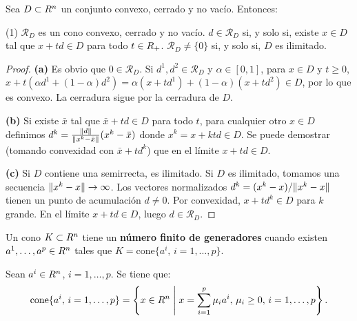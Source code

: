 \begin{proposition}\label{v1:prop:3.2.7}
 Sea $D \subset R^n$ un conjunto convexo, cerrado y no vacío. Entonces:
 \begin{tasks}(1)
 \task $\mathcal{R}_D$ es un cono convexo, cerrado y no vacío.
 \task $d \in \mathcal{R}_D$ si, y solo si, existe $x \in D$ tal que $x + td \in D$ para todo $t \in R_+$.
 \task $\mathcal{R}_D \neq \{0\}$ si, y solo si, $D$ es ilimitado.
 \end{tasks}
\end{proposition}

\begin{proof}
 \textbf{(a)} Es obvio que $0 \in \mathcal{R}_D$. Si $d^1, d^2 \in \mathcal{R}_D$ y $\alpha \in [0,1]$, para $x \in D$ y $t \geq 0$, $x + t(\alpha d^1 + (1 - \alpha)d^2) = \alpha(x + td^1) + (1 - \alpha)(x + td^2) \in D$, por lo que es convexo. La cerradura sigue por la cerradura de $D$.
 
 \textbf{(b)} Si existe $\bar{x}$ tal que $\bar{x} + td \in D$ para todo $t$, para cualquier otro $x \in D$ definimos $d^k = \frac{\lVert d\rVert}{\lVert x^k - \bar{x}\rVert} (x^k - \bar{x})$ donde $x^k = x + ktd \in D$. Se puede demostrar (tomando convexidad con $\bar{x} + td^k$) que en el límite $x + td \in D$.
 
 \textbf{(c)} Si $D$ contiene una semirrecta, es ilimitado. Si $D$ es ilimitado, tomamos una secuencia $\lVert x^k - x\rVert \to \infty$. Los vectores normalizados $d^k = (x^k - x)/\lVert x^k - x\rVert$ tienen un punto de acumulación $d \neq 0$. Por convexidad, $x + t d^k \in D$ para $k$ grande. En el límite $x + td \in D$, luego $d \in \mathcal{R}_D$.
\end{proof}

\begin{definition}\label{v1:def:3.2.4}
 Un cono $K \subset R^n$ tiene un \textbf{número finito de generadores} cuando existen $a^1, \dots, a^p \in R^n$ tales que $K = \text{cone}\{a^i, \, i = 1, \dots, p\}$.
\end{definition}

\begin{proposition}\label{v1:prop:3.2.8}
 Sean $a^i \in R^n$, $i = 1, \dots, p$. Se tiene que:
 \begin{equation}
 \text{cone}\{a^i, \, i = 1, \dots, p\} = \left\{ x \in R^n \;\middle|\; x = \sum_{i=1}^p \mu_i a^i, \, \mu_i \geq 0, \, i = 1, \dots, p \right\}. \label{v1:eq:3.6}
 \end{equation}
\end{proposition}

